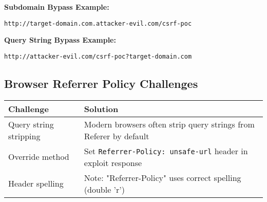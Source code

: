 \documentclass{article}
\begin{document}
\newpage

\textbf{Subdomain Bypass Example:}
\begin{lstlisting}[frame=single, basicstyle=\footnotesize\ttfamily]
http://target-domain.com.attacker-evil.com/csrf-poc
\end{lstlisting}

\textbf{Query String Bypass Example:}
\begin{lstlisting}[frame=single, basicstyle=\footnotesize\ttfamily]
http://attacker-evil.com/csrf-poc?target-domain.com
\end{lstlisting}

\subsection*{Browser Referrer Policy Challenges}
\begin{tabular}{>{\raggedright\arraybackslash}p{}>{\raggedright\arraybackslash}p{}}
    \toprule
    \textbf{Challenge} & \textbf{Solution} \\
    \midrule
    Query string stripping & Modern browsers often strip query strings from Referer by default \\
    Override method & Set \texttt{Referrer-Policy: unsafe-url} header in exploit response \\
    Header spelling & Note: "Referrer-Policy" uses correct spelling (double 'r') \\
    \bottomrule
\end{tabular}
\end{document}
